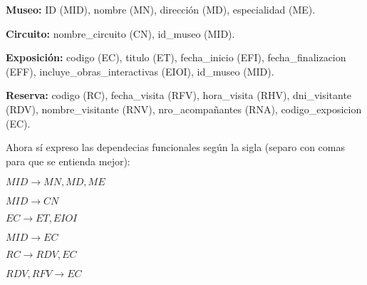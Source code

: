 \documentclass[a4paper,12pt]{article}
\begin{document}
\begin{enumerate}[label=\textbf{\arabic*.}]
    \textbf{Museo:} ID (MID), nombre (MN), dirección (MD), especialidad (ME).

    \vspace{0.1cm}
    
    \textbf{Circuito:} nombre\_circuito (CN), id\_museo (MID).

    \vspace{0.1cm}
    
    \textbf{Exposición:} codigo (EC), titulo (ET), fecha\_inicio (EFI), fecha\_finalizacion (EFF), incluye\_obras\_interactivas (EIOI), id\_museo (MID).

    \vspace{0.1cm}

    \textbf{Reserva:} codigo (RC), fecha\_visita (RFV), hora\_visita (RHV), dni\_visitante (RDV), nombre\_visitante (RNV), nro\_acompañantes (RNA), codigo\_exposicion (EC).

    \vspace{0.1cm}

    Ahora sí expreso las dependecias funcionales según la sigla (separo con comas para que se entienda mejor):

    \begin{center}
        $MID \rightarrow MN, MD, ME$

        $MID \rightarrow CN$
    
        $EC \rightarrow ET, EIOI$
    
        $MID \rightarrow EC$
    
        $RC \rightarrow RDV, EC$
    
        $RDV, RFV \rightarrow EC$   
    \end{center}


    
\end{enumerate}
\end{document}
